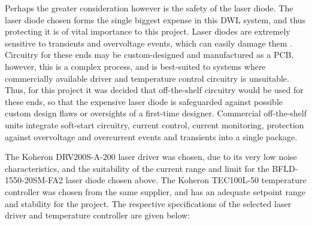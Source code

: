  Perhaps the greater consideration however is the safety of the laser diode. The laser diode chosen forms the single biggest expense in this DWL system, and thus protecting it is of vital importance to this project. Laser diodes are extremely sensitive to transients and overvoltage events, which can easily damage them \cite{Gwinner2024}. Circuitry for these ends may be custom-designed and manufactured as a PCB, however, this is a complex process, and is best-suited to systems where commercially available driver and temperature control circuitry is unsuitable. Thus, for this project it was decided that off-the-shelf circuitry would be used for these ends, so that the expensive laser diode is safeguarded against possible custom design flaws or oversights of a first-time designer. Commercial off-the-shelf units integrate soft-start circuitry, current control, current monitoring, protection against overvoltage and overcurrent events and transients into a single package.
 
 The Koheron DRV200S-A-200 laser driver was chosen, due to its very low noise characteristics, and the suitability of the current range and limit for the BFLD-1550-20SM-FA2 laser diode chosen above. The Koheron TEC100L-50 temperature controller was chosen from the same supplier, and has an adequate setpoint range and stability for the project. The respective specifications of the selected laser driver and  temperature controller are given below:
 
